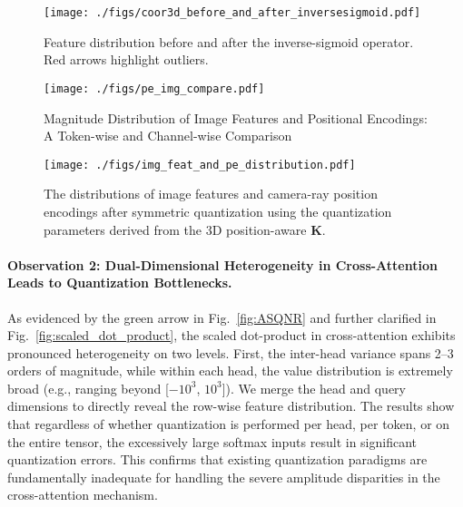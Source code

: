 

\begin{figure}[htb]
\centering
	\texttt{[image: ./figs/coor3d\_before\_and\_after\_inversesigmoid.pdf]}
	\caption{Feature distribution before and after the inverse-sigmoid operator. Red arrows highlight outliers.}
	\label{fig:distribution_before_and_after_insigmoid}
\end{figure}
\vspace{-0.5cm}
\begin{figure}[htb]
\centering
	\texttt{[image: ./figs/pe\_img\_compare.pdf]}
	\caption{Magnitude Distribution of Image Features and Positional Encodings: A Token-wise and Channel-wise Comparison}
	\label{fig:pe_img_compare}
\end{figure}


\begin{figure}[htb]
\centering
	\texttt{[image: ./figs/img\_feat\_and\_pe\_distribution.pdf]}
    \vspace{-0.3cm}
	\caption{The distributions of image features and camera-ray position encodings after symmetric quantization using the quantization parameters derived from the 3D position-aware $\mathbf{K}$.}
	\label{fig:magnitude_distributions_of_image_feature_and_camera_ray_PE}
\end{figure}
\vspace{-0.5cm}


\paragraph{Observation 2: Dual-Dimensional Heterogeneity in Cross-Attention Leads to Quantization Bottlenecks.}

As evidenced by the green arrow in Fig.~\ref{fig:ASQNR} and further clarified in Fig.~\ref{fig:scaled_dot_product}, the scaled dot-product in cross-attention exhibits pronounced heterogeneity on two levels. First, the inter-head variance spans 2–3 orders of magnitude, while within each head, the value distribution is extremely broad (e.g., ranging beyond [$-10^3$, $10^3$]). We merge the head and query dimensions to directly reveal the row-wise feature distribution. The results show that regardless of whether quantization is performed per head, per token, or on the entire tensor, the excessively large softmax inputs result in significant quantization errors. This confirms that existing quantization paradigms are fundamentally inadequate for handling the severe amplitude disparities in the cross-attention mechanism.



